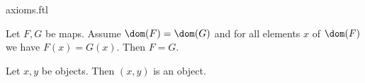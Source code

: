 \documentclass{stex}
\begin{document}
\begin{smodule}{axioms.ftl}
\begin{forthel}
    \begin{lemma}
      Let $F, G$ be maps.
      Assume $\dom(F) = \dom(G)$ and for all elements $x$ of $\dom(F)$ we have
      $F(x) = G(x)$.
      Then $F = G$.
    \end{lemma}



    \begin{lemma}
      Let $x, y$ be objects.
      Then $(x,y)$ is an object.
    \end{lemma}
  \end{forthel}
\end{smodule}
\end{document}
